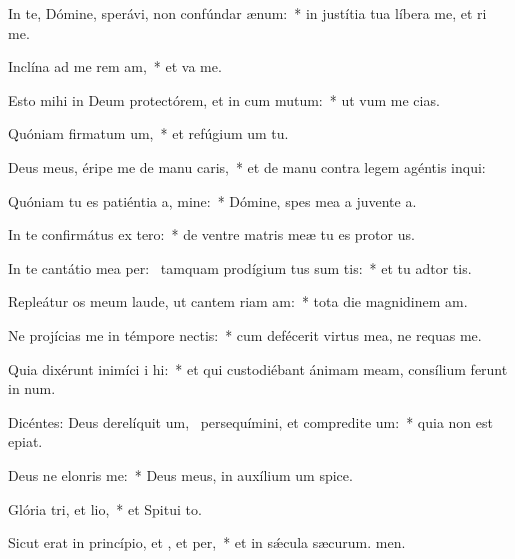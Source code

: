 \item In te, Dómine, sperávi, non confúndar  ænum:~* in justítia tua líbera me, et ri me.
\item Inclína ad me rem am,~* et va me.
\item Esto mihi in Deum protectórem, et in cum mutum:~* ut vum me cias.
\item Quóniam firmatum um,~* et refúgium um  tu.
\item Deus meus, éripe me de manu caris,~* et de manu contra legem agéntis  inqui:
\item Quóniam tu es patiéntia a, mine:~* Dómine, spes mea a juvente a.
\item In te confirmátus  ex tero:~* de ventre matris meæ tu es protor us.
\item In te cantátio mea per:~\pscross{} tamquam prodígium tus sum tis:~* et tu adtor tis.
\item Repleátur os meum laude, ut cantem riam am:~* tota die magnidinem am.
\item Ne projícias me in témpore nectis:~* cum defécerit virtus mea, ne requas me.
\item Quia dixérunt inimíci i hi:~* et qui custodiébant ánimam meam, consílium ferunt in num.
\item Dicéntes: Deus derelíquit um,~\pscross{} persequímini, et compredite um:~* quia non est  epiat.
\item Deus ne elonris  me:~* Deus meus, in auxílium um spice.
\item Glória tri, et lio,~* et Spitui to.
\item Sicut erat in princípio, et , et per,~* et in sǽcula sæcurum. men.
